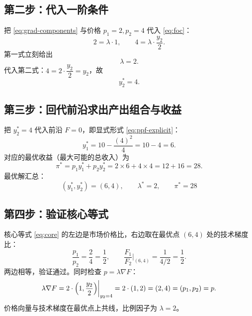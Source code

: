 \subsection{第二步：代入一阶条件}

把 \eqref{eq:grad-components} 与价格 $p_1=2,p_2=4$ 代入 \eqref{eq:foc}：
\begin{equation}
2=\lambda\cdot 1,
\qquad
4=\lambda\cdot \frac{y_2}{2}.
\label{eq:foc-numbers}
\end{equation}
第一式立刻给出
\begin{equation}
\lambda=2.
\label{eq:lambda-value}
\end{equation}
代入第二式：$4=2\cdot \dfrac{y_2}{2}=y_2$，故
\begin{equation}
y_2^{*}=4.
\label{eq:y2-star}
\end{equation}

\subsection{第三步：回代前沿求出产出组合与收益}

把 $y_2^{*}=4$ 代入前沿 $F=0$，即显式形式 \eqref{eq:ppf-explicit}：
\begin{equation}
y_1^{*}=10-\frac{(4)^{2}}{4}=10-4=6.
\label{eq:y1-star}
\end{equation}
对应的最优收益（最大可能的总收入）为
\begin{equation}
\pi^{*}=p_1y_1^{*}+p_2y_2^{*}=2\times 6+4\times 4=12+16=28.
\label{eq:pi-star}
\end{equation}
最优解汇总：
\begin{equation}
\boxed{\ (y_1^{*},y_2^{*})=(6,4),\qquad \lambda^{*}=2,\qquad \pi^{*}=28\ }
\label{eq:solution}
\end{equation}

\subsection{第四步：验证核心等式}

核心等式 \eqref{eq:core} 的左边是市场价格比，右边取在最优点 $(6,4)$ 处的技术梯度比：
\begin{equation}
\frac{p_1}{p_2}=\frac{2}{4}=\frac12,
\qquad
\frac{F_1}{F_2}\bigg|_{(6,4)}=\frac{1}{4/2}=\frac{1}{2}.
\label{eq:core-check}
\end{equation}
两边相等，验证通过。同时检查 $p=\lambda\nabla F$：
\begin{equation}
\lambda\nabla F=2\cdot\Bigl(1,\frac{y_2}{2}\Bigr)\bigg|_{y_2=4}
=2\cdot(1,2)=(2,4)=(p_1,p_2)=p.
\label{eq:p-lambda-grad}
\end{equation}
价格向量与技术梯度在最优点上共线，比例因子为 $\lambda=2$。

